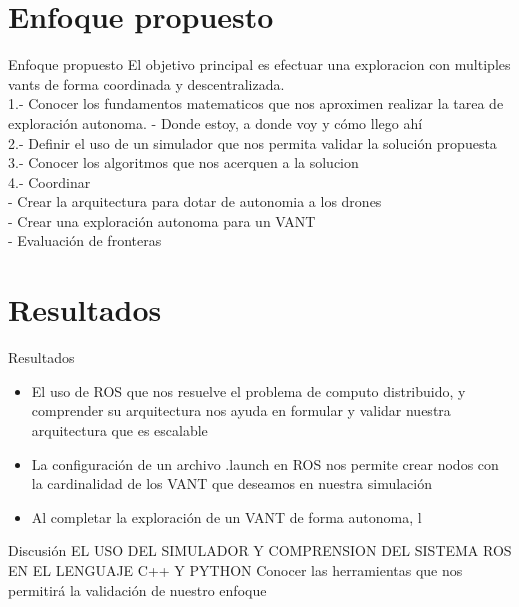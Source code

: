 \documentclass[
  24pt, %
  aspectratio=169, %
]{beamer}
\begin{document}
\section{Enfoque propuesto}
\begin{frame}{Enfoque propuesto}
  El objetivo principal es efectuar una exploracion con multiples vants de forma coordinada y descentralizada.\\

  1.- Conocer los fundamentos matematicos que nos aproximen realizar la tarea de exploración autonoma.
  - Donde estoy, a donde voy y cómo llego ahí\\

  2.- Definir el uso de un simulador que nos permita validar la solución propuesta\\

  3.- Conocer los algoritmos que nos acerquen a la solucion\\

  4.- Coordinar\\

  - Crear la arquitectura para dotar de autonomia a los drones\\
  - Crear una exploración autonoma para un VANT\\
  - Evaluación de fronteras \\
  
\end{frame}

\section{Resultados}
\begin{frame}{Resultados}
  \begin{itemize}
  \item El uso de ROS que nos resuelve el problema de computo distribuido, y comprender su arquitectura nos ayuda en formular y validar nuestra arquitectura que es escalable
  \item La configuración de un archivo .launch en ROS nos permite crear nodos con la cardinalidad de los VANT que deseamos en nuestra simulación
  \item Al completar la exploración de un VANT de forma autonoma, l
  \end{itemize}
\end{frame}

\begin{frame}{Discusión}
  EL USO DEL SIMULADOR Y COMPRENSION DEL SISTEMA ROS EN EL LENGUAJE C++ Y PYTHON
  Conocer las herramientas que nos permitirá la validación de nuestro enfoque
\end{frame}
\end{document}
